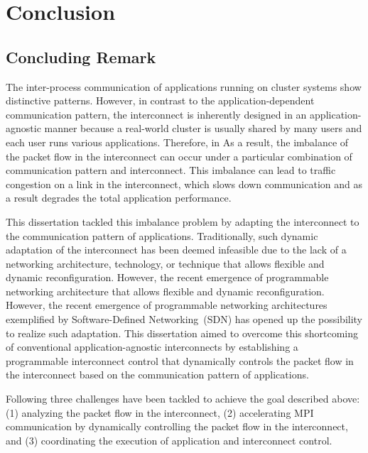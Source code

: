 \chapter{Conclusion}\label{sec:v}

\section{Concluding Remark}
The inter-process communication of applications running on cluster systems
show distinctive patterns. However, in contrast to the application-dependent
communication pattern, the interconnect is inherently designed in an
application-agnostic manner because a real-world cluster is usually shared by
many users and each user runs various applications. Therefore, in As a result,
the imbalance of the packet flow in the interconnect can occur under a
particular combination of communication pattern and interconnect. This
imbalance can lead to traffic congestion on a link in the interconnect, which
slows down communication and as a result degrades the total application
performance.

This dissertation tackled this imbalance problem by adapting the interconnect
to the communication pattern of applications. Traditionally, such dynamic
adaptation of the interconnect has been deemed infeasible due to the lack of a
networking architecture, technology, or technique that allows flexible and
dynamic reconfiguration. However, the recent emergence of programmable
networking architecture that allows flexible and dynamic reconfiguration.
However, the recent emergence of programmable networking architectures
exemplified by Software-Defined Networking~(SDN) has opened up the possibility
to realize such adaptation. This dissertation aimed to overcome this
shortcoming of conventional application-agnostic interconnects by establishing
a programmable interconnect control that dynamically controls the packet flow
in the interconnect based on the communication pattern of applications.

Following three challenges have been tackled to achieve the goal described
above: (1) analyzing the packet flow in the interconnect, (2) accelerating MPI
communication by dynamically controlling the packet flow in the interconnect,
and (3) coordinating the execution of application and interconnect control.

